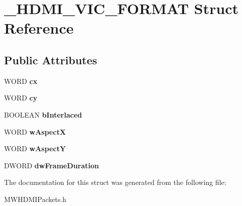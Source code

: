 \hypertarget{struct__HDMI__VIC__FORMAT}{\section{\-\_\-\-H\-D\-M\-I\-\_\-\-V\-I\-C\-\_\-\-F\-O\-R\-M\-A\-T Struct Reference}
\label{struct__HDMI__VIC__FORMAT}
}
\subsection*{Public Attributes}
\begin{DoxyCompactItemize}
\item 
\hypertarget{struct__HDMI__VIC__FORMAT_a33899d008f0a0a26417778bf98b8358f}{W\-O\-R\-D {\bfseries cx}}\label{struct__HDMI__VIC__FORMAT_a33899d008f0a0a26417778bf98b8358f}

\item 
\hypertarget{struct__HDMI__VIC__FORMAT_a568a9071e07cfd61a0a04545cda127e8}{W\-O\-R\-D {\bfseries cy}}\label{struct__HDMI__VIC__FORMAT_a568a9071e07cfd61a0a04545cda127e8}

\item 
\hypertarget{struct__HDMI__VIC__FORMAT_a8a950c348711dd439959cdd19d8a9d48}{B\-O\-O\-L\-E\-A\-N {\bfseries b\-Interlaced}}\label{struct__HDMI__VIC__FORMAT_a8a950c348711dd439959cdd19d8a9d48}

\item 
\hypertarget{struct__HDMI__VIC__FORMAT_aaa31286289313213a9b860b32be90a84}{W\-O\-R\-D {\bfseries w\-Aspect\-X}}\label{struct__HDMI__VIC__FORMAT_aaa31286289313213a9b860b32be90a84}

\item 
\hypertarget{struct__HDMI__VIC__FORMAT_ae0398eefe3a7aa2c15850b4b7abecb34}{W\-O\-R\-D {\bfseries w\-Aspect\-Y}}\label{struct__HDMI__VIC__FORMAT_ae0398eefe3a7aa2c15850b4b7abecb34}

\item 
\hypertarget{struct__HDMI__VIC__FORMAT_a0329f7ae620f0a1df48ce0831c28afb9}{D\-W\-O\-R\-D {\bfseries dw\-Frame\-Duration}}\label{struct__HDMI__VIC__FORMAT_a0329f7ae620f0a1df48ce0831c28afb9}

\end{DoxyCompactItemize}


The documentation for this struct was generated from the following file\-:\begin{DoxyCompactItemize}
\item 
M\-W\-H\-D\-M\-I\-Packets.\-h\end{DoxyCompactItemize}
